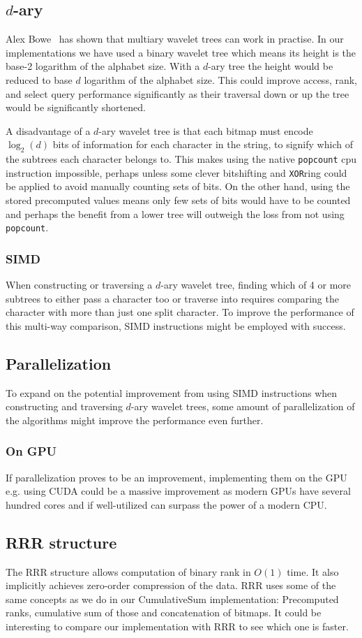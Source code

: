 \subsection{$d$-ary}
Alex Bowe~ has shown that multiary wavelet trees can work in practise.
In our implementations we have used a binary wavelet tree which means its height is the base-2 logarithm of the alphabet size.
With a $d$-ary tree the height would be reduced to base $d$ logarithm of the alphabet size.
This could improve access, rank, and select query performance significantly as their traversal down or up the tree would be significantly shortened.

A disadvantage of a $d$-ary wavelet tree is that each bitmap must encode $\log_2(d)$ bits of information for each character in the string, to signify which of the subtrees each character belongs to.
This makes using the native \texttt{popcount} cpu instruction impossible, perhaps unless some clever bitshifting and \texttt{XOR}ring could be applied to avoid manually counting sets of bits.
On the other hand, using the stored precomputed values means only few sets of bits would have to be counted and perhaps the benefit from a lower tree will outweigh the loss from not using \texttt{popcount}.

\subsubsection{SIMD}
When constructing or traversing a $d$-ary wavelet tree, finding which of 4 or more subtrees to either pass a character too or traverse into requires comparing the character with more than just one split character.
To improve the performance of this multi-way comparison, SIMD instructions might be employed with success.


\subsection{Parallelization}
To expand on the potential improvement from using SIMD instructions when constructing and traversing $d$-ary wavelet trees, some amount of parallelization of the algorithms might improve the performance even further.
\subsubsection{On GPU}
If parallelization proves to be an improvement, implementing them on the GPU e.g. using CUDA could be a massive improvement as modern GPUs have several hundred cores and if well-utilized can surpass the power of a modern CPU.

\subsection{RRR structure}
The RRR structure allows computation of binary rank in $O(1)$ time. 
It also implicitly achieves zero-order compression of the data.
RRR uses some of the same concepts as we do in our CumulativeSum implementation: Precomputed ranks, cumulative sum of those and concatenation of bitmaps.
It could be interesting to compare our implementation with RRR to see which one is faster.

